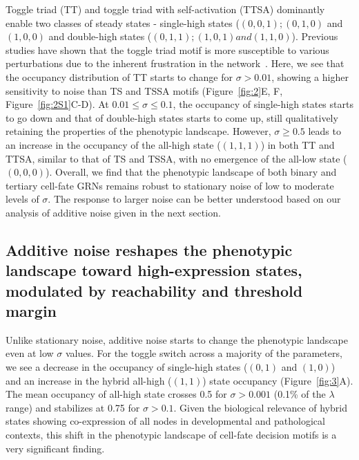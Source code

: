 \documentclass[11pt]{article}
\providecommand{\DIFaddtex}[1]{{\protect\color{red}#1}} %
\providecommand{\DIFdeltex}[1]{} %
\providecommand{\DIFaddbegin}{} %
\providecommand{\DIFaddend}{} %
\providecommand{\DIFdelbegin}{} %
\providecommand{\DIFdelend}{} %
\providecommand{\DIFadd}[1]{\texorpdfstring{\DIFaddtex{#1}}{#1}} %
\providecommand{\DIFdel}[1]{\texorpdfstring{\DIFdeltex{#1}}{}} %
\providecommand{\DIFaddincludegraphics}[2][]{\DIFOincludegraphics[#1]{#2}} %
\providecommand{\DIFdelincludegraphics}[2][]{}
\DeclareRobustCommand{\DIFaddbegin}{\DIFOaddbegin \let\includegraphics\DIFaddincludegraphics} %
\DeclareRobustCommand{\DIFaddend}{\DIFOaddend \let\includegraphics\DIFOincludegraphics} %
\DeclareRobustCommand{\DIFdelbegin}{\DIFOdelbegin \let\includegraphics\DIFdelincludegraphics} %
\DeclareRobustCommand{\DIFdelend}{\DIFOaddend \let\includegraphics\DIFOincludegraphics} %
\begin{document}
Toggle triad (TT) and toggle triad with self-activation (TTSA) dominantly enable two classes of steady states - single-high states ($(0, 0, 1); (0, 1, 0)$ and $(1, 0, 0)$ and double-high states ($(0, 1, 1); (1, 0, 1) and (1, 1, 0)$). Previous studies have shown that the toggle triad motif is more susceptible to various perturbations due to the inherent frustration in the network~\cite{harlapur2022functional, doi:10.1098/rsif.2020.0631}. Here, we see that the \DIFdelbegin \DIFdel{MRT }\DIFdelend \DIFaddbegin \DIFadd{occupancy }\DIFaddend distribution of TT starts to change for $\sigma > 0.01$, showing a higher sensitivity to noise than TS and TSSA motifs (Figure~\ref{fig:2}E, F, Figure~\ref{fig:2S1}C-D). At $0.01 \leq \sigma \leq 0.1$, the \DIFdelbegin \DIFdel{MRT }\DIFdelend \DIFaddbegin \DIFadd{occupancy }\DIFaddend of single-high states starts to go down and that of double-high states starts to come up, still qualitatively retaining the properties of the phenotypic landscape. However, $\sigma \geq 0.5$ leads to an increase in the \DIFdelbegin \DIFdel{MRT }\DIFdelend \DIFaddbegin \DIFadd{occupancy }\DIFaddend of the all-high state ($(1, 1, 1)$) in both TT and TTSA, similar to that of TS and TSSA, with no emergence of the all-low state ($(0, 0, 0)$). Overall, we find that the phenotypic landscape of both binary and tertiary cell-fate GRNs remains robust to stationary noise of low to moderate levels of $\sigma$. The response to larger noise can be better understood based on our analysis of additive noise given in the next section. 


\subsection{Additive noise reshapes the phenotypic landscape toward high-expression states, modulated by reachability and threshold margin}

Unlike stationary noise, additive noise starts to change the phenotypic landscape even at low $\sigma$ values. For the toggle switch across a majority of the parameters, we see a decrease in the \DIFdelbegin \DIFdel{MRT }\DIFdelend \DIFaddbegin \DIFadd{occupancy }\DIFaddend of single-high states ($(0, 1)$ and $(1, 0)$) and an increase in the hybrid all-high ($(1, 1)$) state \DIFdelbegin \DIFdel{MRT }\DIFdelend \DIFaddbegin \DIFadd{occupancy }\DIFaddend (Figure~\ref{fig:3}A). The mean \DIFdelbegin \DIFdel{MRT }\DIFdelend \DIFaddbegin \DIFadd{occupancy }\DIFaddend of all-high state crosses 0.5 for $\sigma > 0.001$ (0.1\% of the $\lambda$ range) and stabilizes at 0.75 for $\sigma > 0.1$. Given the biological relevance of hybrid states showing co-expression of all nodes in developmental and pathological contexts, this shift in the phenotypic landscape of cell-fate decision motifs is a very significant finding. 
\end{document}
